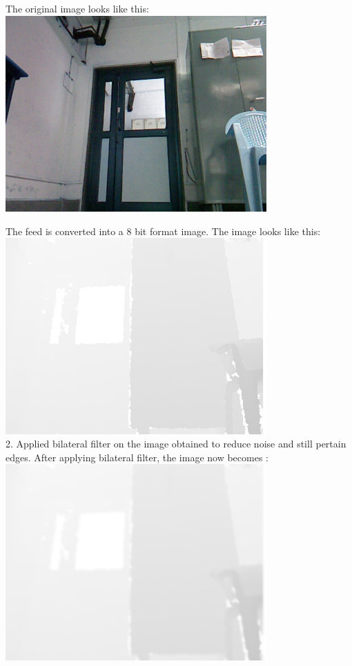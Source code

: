 \documentclass{report}
\begin{document}
The original image looks like this:\\
\includegraphics[width = 10cm]{reference.jpg}

The feed is converted into a 8 bit format image. The image looks like this:\\
\includegraphics[width = 10cm]{feed.jpg} \\

 2. Applied bilateral filter on the image obtained to reduce noise and still pertain edges. After
    applying bilateral filter, the image now becomes : \\
    \includegraphics[width = 10cm]{bilat.jpg}
\end{document}
